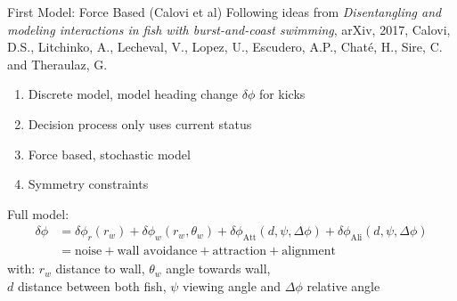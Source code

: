 \documentclass{beamer}
\begin{document}
\begin{frame}{First Model: Force Based (Calovi et al)}
Following ideas from \textit{Disentangling and modeling interactions in fish with burst-and-coast swimming}, arXiv, 2017, {\tiny{Calovi, D.S., Litchinko, A., Lecheval, V., Lopez, U., Escudero, A.P., Chaté, H., Sire, C. and Theraulaz, G.}} 

\begin{enumerate}
\item Discrete model, model heading change $\delta \phi$ for kicks
\item Decision process only uses current status
\item Force based, stochastic model
\item Symmetry constraints 
\end{enumerate}

Full model:
\begin{align*}
  \label{eq:calovi-model}
  \delta \phi &= \delta \phi_r (r_w) + \delta \phi_w (r_w, \theta_w) + \delta \phi_\text{Att} (d, \psi, \Delta \phi) + \delta \phi_\text{Ali}  (d, \psi, \Delta \phi) \\
  &= \text{noise} + \text{wall avoidance} + \text{attraction} + \text{alignment}
\end{align*}
with: $r_w$ distance to wall, $\theta_w$ angle towards wall,\\ $d$ distance between both fish, $\psi$ viewing angle and $\Delta \phi$ relative angle
\end{frame}
\end{document}
